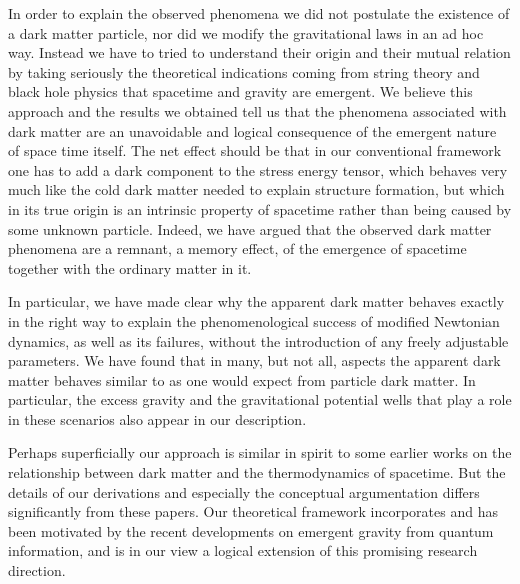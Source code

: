 \documentclass[a4paper,12pt]{article}
\begin{document}
\noindent In order to explain the observed phenomena we did not postulate the existence of a dark matter particle, nor did we modify the gravitational laws in an ad hoc way. Instead we have to tried to understand their origin and their mutual relation by taking seriously the theoretical indications coming from string theory and black hole physics that spacetime and gravity are emergent. We believe this approach and the results we obtained tell us that  the phenomena associated with dark matter are an unavoidable and  logical consequence of the emergent nature of space time itself.  The net effect should be that in our conventional framework one has to add a dark component to the stress energy tensor, which behaves very much like the cold dark matter needed to explain structure formation, but which in its true origin is an intrinsic property of spacetime rather than being caused by some unknown particle.  Indeed, we have argued that the observed dark matter phenomena are a remnant, a memory effect, of the emergence of spacetime together with the ordinary matter in it.  

In particular, we have made clear why the apparent dark matter behaves exactly in the right way to explain the phenomenological success of modified Newtonian dynamics, as well as its failures, without the introduction of any freely adjustable parameters.    We have found that in 
many, but not all, aspects the apparent dark matter behaves similar to as one would expect from
particle dark matter. In particular, the excess gravity and the gravitational potential wells that play a role in these scenarios also appear in our description.  


Perhaps superficially our approach is similar in spirit to some earlier works \cite{Klinkhamer,Pikhitsa, Minic1, Minic2,Minic4} on the relationship between dark matter and the thermodynamics of spacetime. But the details of our derivations and especially the conceptual argumentation differs significantly from these papers. Our theoretical framework incorporates and has been motivated by the recent developments on emergent gravity from quantum information, and is in our view a logical extension of this promising research direction.  


\end{document}
